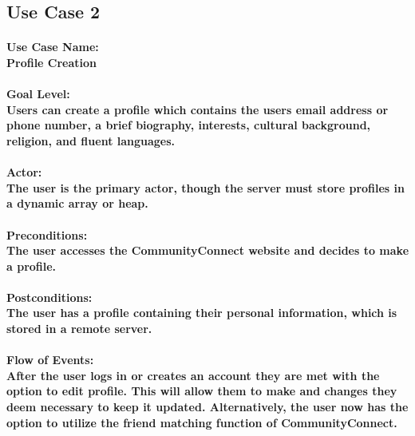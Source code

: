 \documentclass[12pt]{article}
\begin{document}
	\subsection{\bf Use Case 2}
                        \paragraph{\normalfont \textbf{Use Case Name:}\\ Profile Creation
                        }
                        \paragraph{\normalfont \textbf{Goal Level:}\\ Users can create a profile which contains the users email address or phone number, a brief biography, interests, cultural background, religion, and fluent languages.
                        }
                        \paragraph{\normalfont \textbf{Actor:}\\The user is the primary actor, though the server must store profiles in a dynamic array or heap.
                        }
                        \paragraph{\normalfont \textbf{Preconditions:}\\The user accesses the CommunityConnect website and decides to make a profile.
                        }
                        \paragraph{\normalfont \textbf{Postconditions:}\\The user has a profile containing their personal information, which is stored in a remote server.
                        }
                        \paragraph{\normalfont \textbf{Flow of Events:}\\After the user logs in or creates an account they are met with the option to edit profile. This will allow them to make and changes they deem necessary to keep it updated. Alternatively, the user now has the option to utilize the friend matching function of CommunityConnect.
                        }
\end{document}
